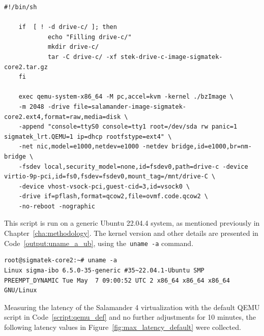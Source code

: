 \documentclass[MMR,Master,english]{twbook}
\begin{document}
\vspace{1em}
\begin{minipage}{\linewidth}
	\begin{lstlisting}[name={QEMU script for starting Salamander 4 virtualization},label={script:qemu_def}]
	#!/bin/sh

	if  [ ! -d drive-c/ ]; then
			echo "Filling drive-c/"
			mkdir drive-c/
			tar -C drive-c/ -xf stek-drive-c-image-sigmatek-core2.tar.gz
	fi
		
	exec qemu-system-x86_64 -M pc,accel=kvm -kernel ./bzImage \
	-m 2048 -drive file=salamander-image-sigmatek-core2.ext4,format=raw,media=disk \
	-append "console=ttyS0 console=tty1 root=/dev/sda rw panic=1 sigmatek_lrt.QEMU=1 ip=dhcp rootfstype=ext4" \
	-net nic,model=e1000,netdev=e1000 -netdev bridge,id=e1000,br=nm-bridge \
	-fsdev local,security_model=none,id=fsdev0,path=drive-c -device virtio-9p-pci,id=fs0,fsdev=fsdev0,mount_tag=/mnt/drive-C \
	-device vhost-vsock-pci,guest-cid=3,id=vsock0 \
	-drive if=pflash,format=qcow2,file=ovmf.code.qcow2 \
	-no-reboot -nographic
\end{lstlisting}
\end{minipage}

\noindent This script is run on a generic Ubuntu 22.04.4 system, as mentioned previously in Chapter~\ref{cha:methodology}. The kernel version and other details are presented in Code~\ref{output:uname_a_ub}, using the~\texttt{uname -a} command.

\vspace{1em}
\begin{minipage}{0.95\columnwidth}
	\begin{lstlisting}[name={Ubuntu 22.04.4 system information},label={output:uname_a_ub}]
root@sigmatek-core2:~# uname -a 
Linux sigma-ibo 6.5.0-35-generic #35~22.04.1-Ubuntu SMP PREEMPT_DYNAMIC Tue May  7 09:00:52 UTC 2 x86_64 x86_64 x86_64 GNU/Linux
\end{lstlisting}
\end{minipage}

\noindent Measuring the latency of the Salamander 4 virtualization with the default QEMU script in Code~\ref{script:qemu_def} and no further adjustments for 10 minutes, the following latency values in Figure~\ref{fig:max_latency_default} were collected.
\end{document}
